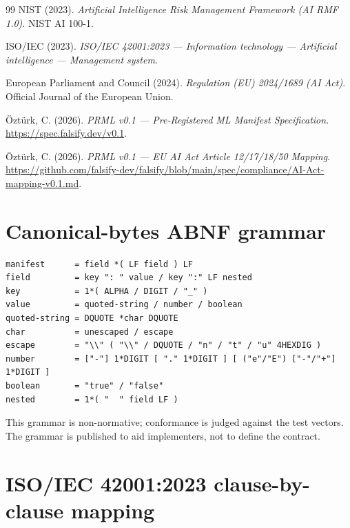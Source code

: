 \documentclass[11pt, a4paper]{article}
\begin{document}
\begin{thebibliography}{99}
NIST (2023). \emph{Artificial Intelligence Risk Management Framework (AI RMF 1.0)}. NIST AI 100-1.

ISO/IEC (2023). \emph{ISO/IEC 42001:2023 --- Information technology --- Artificial intelligence --- Management system}.

European Parliament and Council (2024). \emph{Regulation (EU) 2024/1689 (AI Act)}. Official Journal of the European Union.

Öztürk, C. (2026). \emph{PRML v0.1 --- Pre-Registered ML Manifest Specification}. \url{https://spec.falsify.dev/v0.1}.

Öztürk, C. (2026). \emph{PRML v0.1 --- EU AI Act Article 12/17/18/50 Mapping}. \url{https://github.com/falsify-dev/falsify/blob/main/spec/compliance/AI-Act-mapping-v0.1.md}.

\end{thebibliography}

\appendix

\section{Canonical-bytes ABNF grammar}
\label{app:abnf}

\begin{verbatim}
manifest      = field *( LF field ) LF
field         = key ": " value / key ":" LF nested
key           = 1*( ALPHA / DIGIT / "_" )
value         = quoted-string / number / boolean
quoted-string = DQUOTE *char DQUOTE
char          = unescaped / escape
escape        = "\\" ( "\\" / DQUOTE / "n" / "t" / "u" 4HEXDIG )
number        = ["-"] 1*DIGIT [ "." 1*DIGIT ] [ ("e"/"E") ["-"/"+"] 1*DIGIT ]
boolean       = "true" / "false"
nested        = 1*( "  " field LF )
\end{verbatim}

This grammar is non-normative; conformance is judged against the test vectors. The grammar is published to aid implementers, not to define the contract.

\section{ISO/IEC 42001:2023 clause-by-clause mapping}
\label{app:iso}
\end{document}
